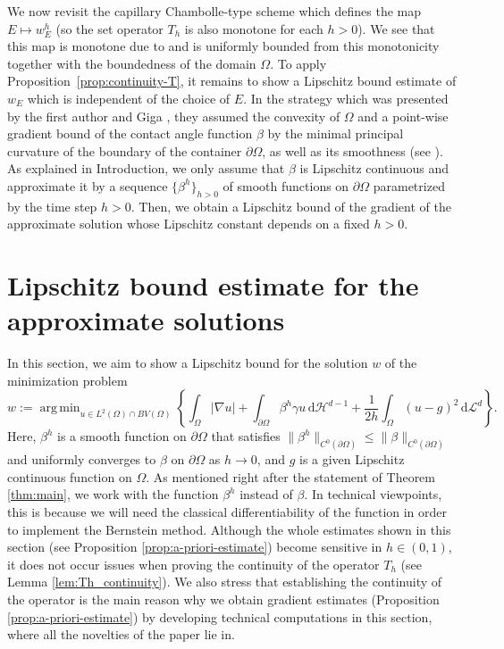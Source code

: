 \documentclass[11pt]{article}
\numberwithin{equation}{section}
\newcommand{\pOmega}[0]{\partial\Omega}
\DeclareMathOperator*{\argmin}{arg\,min}
\def\leq{\leqslant}
\begin{document}
We now revisit the capillary Chambolle-type scheme which defines the map $E\mapsto w_E^h$ (so the set operator $T_h$ is also monotone for each $h>0$).
We see that this map is monotone due to \cite[Lemma 3.1]{EG25} and is uniformly bounded from this monotonicity together with the boundedness of the domain $\Omega$.
To apply Proposition~\ref{prop:continuity-T}, it remains to show a Lipschitz bound estimate of $w_E$ which is independent of the choice of $E$.
In the strategy which was presented by the first author and Giga \cite{EG25}, they assumed the convexity of $\Omega$
and a point-wise gradient bound of the contact angle function $\beta$ by the minimal principal curvature of the boundary of 
the container $\pOmega$, as well as its smoothness (see \cite[Theorem 3.1]{EG25}).
As explained in Introduction, we only assume that $\beta$ is Lipschitz continuous and approximate it by a sequence $\{\beta^h\}_{h>0}$ of smooth functions on $\pOmega$ parametrized by the time step $h>0$. Then, we obtain a Lipschitz bound of the gradient of the approximate solution whose Lipschitz constant depends on a fixed $h>0$.

\section{Lipschitz bound estimate for the approximate solutions}
\label{sec:lipschitz-bound}
In this section, we aim to show a Lipschitz bound for the solution $w$ of the minimization problem
\begin{equation}\label{eq:minimization-with-g}
w := \argmin_{u\in L^2(\Omega)\cap BV(\Omega)} \left\{\int_\Omega |\nabla u| + \int_{\partial\Omega}\beta^h\gamma u\,\mathrm{d}\mathcal{H}^{d-1} + \frac{1}{2h}\int_\Omega(u - g)^2\,\mathrm{d}\mathcal{L}^d\right\}.
\end{equation}
Here, $\beta^h$ is a smooth function on $\partial\Omega$ that satisfies $\|\beta^h\|_{C^0(\partial\Omega)} \leq \|\beta\|_{C^0(\partial\Omega)}$ and uniformly converges to $\beta$ on $\pOmega$ as $h\to 0$, and $g$ is a given Lipschitz continuous function on $\Omega$. As mentioned right after the statement of Theorem \ref{thm:main}, we work with the function $\beta^h$ instead of $\beta$. In technical viewpoints, this is because we will need the classical differentiability of the function in order to implement the Bernstein method. Although the whole estimates shown in this section (see Proposition \ref{prop:a-priori-estimate}) become sensitive in $h\in(0,1)$, it does not occur issues when proving the continuity of the operator $T_h$ (see Lemma \ref{lem:Th_continuity}). We also stress that establishing the continuity of the operator is the main reason why we obtain gradient estimates (Proposition \ref{prop:a-priori-estimate}) by developing technical computations in this section, where all the novelties of the paper lie in.
\end{document}
